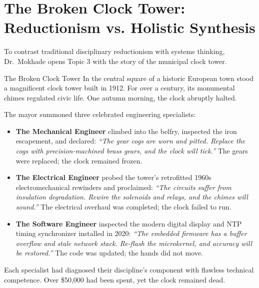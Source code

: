 \section{The Broken Clock Tower: Reductionism vs. Holistic Synthesis}
\label{sec:broken_clock_tower}

To contrast traditional disciplinary reductionism with systems thinking, Dr.~Mokhade opens Topic 3 with the story of the municipal clock tower.

\begin{storybox}{The Broken Clock Tower}
In the central square of a historic European town stood a magnificent clock tower built in 1912. For over a century, its monumental chimes regulated civic life. One autumn morning, the clock abruptly halted.

The mayor summoned three celebrated engineering specialists:
\begin{itemize}[leftmargin=1.5em]
    \item \textbf{The Mechanical Engineer} climbed into the belfry, inspected the iron escapement, and declared: \textit{``The gear cogs are worn and pitted. Replace the cogs with precision-machined brass gears, and the clock will tick.''} The gears were replaced; the clock remained frozen.
    \item \textbf{The Electrical Engineer} probed the tower's retrofitted 1960s electromechanical rewinders and proclaimed: \textit{``The circuits suffer from insulation degradation. Rewire the solenoids and relays, and the chimes will sound.''} The electrical overhaul was completed; the clock failed to run.
    \item \textbf{The Software Engineer} inspected the modern digital display and NTP timing synchronizer installed in 2020: \textit{``The embedded firmware has a buffer overflow and stale network stack. Re-flash the microkernel, and accuracy will be restored.''} The code was updated; the hands did not move.
\end{itemize}
Each specialist had diagnosed their discipline's component with flawless technical competence. Over \$50,000 had been spent, yet the clock remained dead.


\end{storybox}
